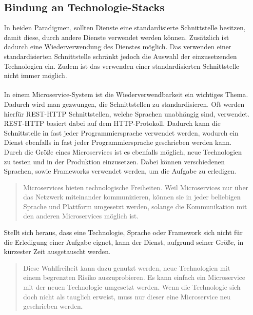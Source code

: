 \subsection{Bindung an Technologie-Stacks}
\label{subsec:BindungAnTechnologiestacks}
In beiden Paradigmen, sollten Dienste eine standardisierte Schnittstelle besitzen, damit diese, durch andere Dienste verwendet werden können. Zusätzlich ist dadurch eine Wiederverwendung des Dienstes möglich. Das verwenden einer standardisierten Schnittstelle schränkt jedoch die Auswahl der einzusetzenden Technologien ein. Zudem ist das verwenden einer standardisierten Schnittstelle nicht immer möglich.
\\\\
In einem Microservice-System ist die Wiederverwendbarkeit ein wichtiges Thema. Dadurch wird man gezwungen, die Schnittstellen zu standardisieren. Oft werden hierfür REST-HTTP Schnittstellen, welche Sprachen unabhängig sind, verwendet. REST-HTTP basiert dabei auf dem HTTP-Protokoll. Dadurch kann die Schnittstelle in fast jeder Programmiersprache verwendet werden, wodurch ein Dienst ebenfalls in fast jeder Programmiersprache geschrieben werden kann. Durch die Größe eines Microservices ist es ebenfalls möglich, neue Technologien zu testen und in der Produktion einzusetzen. Dabei können verschiedenen Sprachen, sowie Frameworks verwendet werden, um die Aufgabe zu erledigen. 

\begin{quotation}
	\frqq Microservices bieten technologische Freiheiten. Weil Microservices nur über das Netzwerk miteinander kommunizieren, können sie in jeder beliebigen Sprache und Plattform umgesetzt werden, solange die Kommunikation mit den anderen Microservices möglich ist.\flqq\ \cite[S. 66]{EWolff2016:Microservices}
\end{quotation}

Stellt sich heraus, dass eine Technologie, Sprache oder Framework sich nicht für die Erledigung einer Aufgabe eignet, kann der Dienst, aufgrund seiner Größe, in kürzester Zeit ausgetauscht werden.

\begin{quotation}
	\frqq Diese Wahlfreiheit kann dazu genutzt werden, neue Technologien mit einem begrenzten Risiko auszuprobieren. Es kann einfach ein Microservice mit der neuen Technologie umgesetzt werden. Wenn die Technologie sich doch nicht als tauglich erweist, muss nur dieser eine Microservice neu geschrieben werden.\flqq\ \cite[S. 66]{EWolff2016:Microservices}
\end{quotation}

